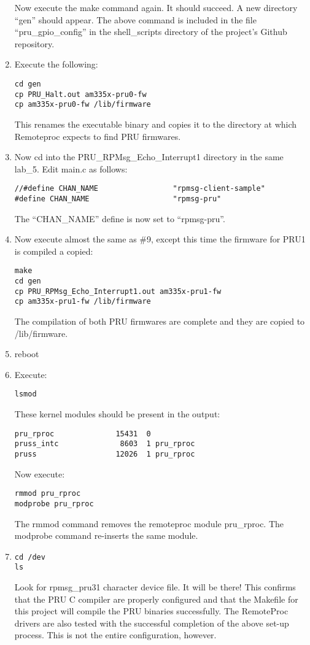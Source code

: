 \begin{enumerate}
Now execute the make command again.  It should succeed.  A new directory ``gen'' should appear.  The above command is included in the file ``pru\_gpio\_config'' in the shell\_scripts directory of the project's Github repository.

\item  Execute the following:
\begin{verbatim}
cd gen
cp PRU_Halt.out am335x-pru0-fw
cp am335x-pru0-fw /lib/firmware
\end{verbatim}
This renames the executable binary and copies it to the directory at which Remoteproc expects to find PRU firmwares.
\item  Now cd into the PRU\_RPMsg\_Echo\_Interrupt1 directory in the same lab\_5.
Edit main.c as follows:
\begin{verbatim}
//#define CHAN_NAME					"rpmsg-client-sample"
#define CHAN_NAME					"rpmsg-pru"
\end{verbatim}
The ``CHAN\_NAME'' define is now set to ``rpmsg-pru''.
\item  Now execute almost the same as \#9, except this time the firmware for PRU1 is compiled a copied:
\begin{verbatim}
make
cd gen
cp PRU_RPMsg_Echo_Interrupt1.out am335x-pru1-fw
cp am335x-pru1-fw /lib/firmware
\end{verbatim}
The compilation of both PRU firmwares are complete and they are copied to /lib/firmware.
\item  reboot
\item  Execute:

\begin{verbatim}
lsmod
\end{verbatim}

These kernel modules should be present in the output:

\begin{verbatim}
pru_rproc              15431  0 
pruss_intc              8603  1 pru_rproc
pruss                  12026  1 pru_rproc
\end{verbatim}
Now execute:
\begin{verbatim}
rmmod pru_rproc
modprobe pru_rproc
\end{verbatim}

The rmmod command removes the remoteproc module pru\_rproc.
The modprobe command re-inserts the same module.
\item  
\begin{verbatim}
cd /dev
ls
\end{verbatim} 

Look for rpmsg\_pru31 character device file.  It will be there!
This confirms that the PRU C compiler are properly configured and that the Makefile for this project will compile the PRU binaries successfully.  The RemoteProc drivers are also tested with the successful completion of the above set-up process.  This is not the entire configuration, however.
\end{enumerate}

